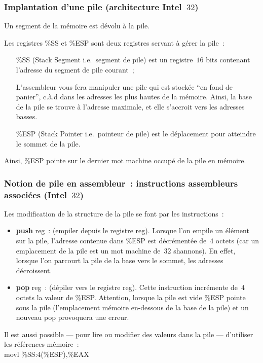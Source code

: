 \begin{frame}
  \frametitle{Implantation d'une pile (architecture Intel~$32$)}%
  Un segment de la m\'emoire est d\'evolu \`a la pile.
  
  Les registres \%SS et \%ESP sont deux registres servant \`a g\'erer la pile~:
  \begin{itemize}
  \item[\%SS] (Stack Segment i.e.\ segment de pile) est un registre~$16$
    bits contenant l'adresse du segment de pile courant~;
  \item[]
  \item[] L'assembleur vous fera manipuler une pile qui est stock\'ee ``en fond
    de panier'', c.\`a.d dans les adresses les plus hautes de la
    m\'emoire. Ainsi, la base de la pile se trouve \`a l'adresse maximale,
    et elle s'accroit vers les adresses basses. 
  \item[]
  \item[\%ESP] (Stack Pointer i.e.\ pointeur de pile) est le d\'eplacement
    pour atteindre le sommet de la pile.
  \end{itemize}
  \par\medskip 
  Ainsi, \%ESP pointe sur le dernier mot machine occup\'e de la pile en m\'emoire.
\end{frame}
\begin{frame}
  \frametitle{Notion de pile en assembleur~: instructions assembleurs
    associ\'ees (Intel~$32$)}
  Les modification de la structure de la pile se font par les
  instructions~:
  \begin{itemize}
  \item\textbf{push} reg~: (empiler depuis le registre reg).  Lorsque l'on
    empile un \'el\'ement sur la pile, l'adresse contenue dans \%ESP est 
    d\'ecr\'ement\'ee de~$4$ octets (car un emplacement de la pile est un 
    mot machine de~$32$ shannons).  En effet, lorsque l'on parcourt
    la pile de la base vers le sommet, les adresses d\'ecroissent.
  \item\textbf{pop} reg~: (d\'epiler vers le registre reg). Cette
    instruction incr\'emente de~$4$ octets la valeur de \%ESP.
    Attention, lorsque la pile est vide \%ESP pointe sous la pile
    (l'emplacement m\'emoire en-dessous de la base de la pile) et un
    nouveau pop provoquera une erreur.
  \end{itemize}
  \par\medskip
  Il est aussi possible --- pour lire ou modifier des valeurs dans la
  pile --- d'utiliser les r\'ef\'erences m\'emoire~: \\
  movl \%SS:4(\%ESP),\%EAX
\end{frame}
